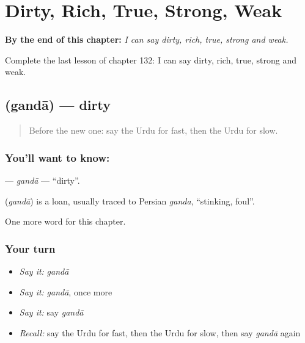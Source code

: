 
\chapter{Dirty, Rich, True, Strong, Weak}
\label{ch:ur-dirty-rich-true-strong-weak}

\begin{chapteropening}
\textbf{By the end of this chapter:} \emph{I can say dirty, rich, true, strong and weak.}

Complete the last lesson of chapter 132: I can say dirty, rich, true, strong and weak.
\end{chapteropening}

\section[\texorpdfstring{\ur{گندا} (gandā)}{گندا (gandā)}]{ (gandā) — dirty}

\label{lesson:UR-C132-ganda}



\begin{quote}
Before the new one: say the Urdu for fast, then the Urdu for slow.
\end{quote}

\subsection*{You'll want to know: }
\textbf{} — \emph{gandā} — \textquotedblleft{}dirty\textquotedblright{}.

\begin{cousinweb}
\textbf{} (\emph{gandā}) is a loan, usually traced to Persian \emph{ganda}, \textquotedblleft{}stinking, foul\textquotedblright{}.
\end{cousinweb}

\begin{grammarlens}[title={What you've built}]
One more word for this chapter.
\end{grammarlens}

\subsection*{Your turn}
\begin{itemize}
\raggedright
  \item \emph{Say it:} \emph{gandā}
  \item \emph{Say it:} \emph{gandā}, once more
  \item \emph{Say it:} say \emph{gandā}
  \item \emph{Recall:} say the Urdu for fast, then the Urdu for slow, then say \emph{gandā} again
\end{itemize}

